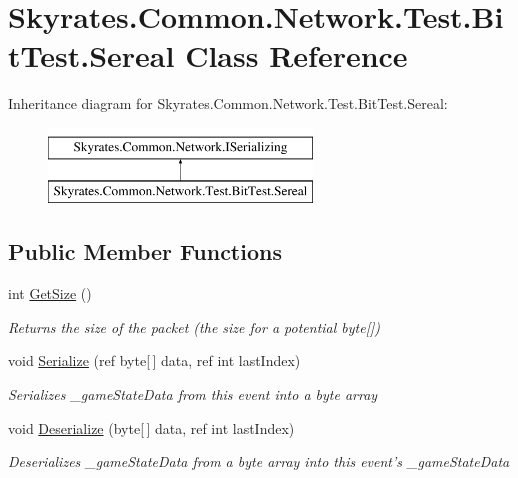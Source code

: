 \hypertarget{class_skyrates_1_1_common_1_1_network_1_1_test_1_1_bit_test_1_1_sereal}{\section{Skyrates.\-Common.\-Network.\-Test.\-Bit\-Test.\-Sereal Class Reference}
\label{class_skyrates_1_1_common_1_1_network_1_1_test_1_1_bit_test_1_1_sereal}
}
Inheritance diagram for Skyrates.\-Common.\-Network.\-Test.\-Bit\-Test.\-Sereal\-:\begin{figure}[H]
\begin{center}
\leavevmode
\includegraphics[height=2.000000cm]{class_skyrates_1_1_common_1_1_network_1_1_test_1_1_bit_test_1_1_sereal}
\end{center}
\end{figure}
\subsection*{Public Member Functions}
\begin{DoxyCompactItemize}
\item 
int \hyperlink{class_skyrates_1_1_common_1_1_network_1_1_test_1_1_bit_test_1_1_sereal_a85e876dc3c76e00117b18a33011aa8a4}{Get\-Size} ()
\begin{DoxyCompactList}\small\item\em Returns the size of the packet (the size for a potential byte\mbox{[}\mbox{]}) \end{DoxyCompactList}\item 
void \hyperlink{class_skyrates_1_1_common_1_1_network_1_1_test_1_1_bit_test_1_1_sereal_a67a9e22bccc860f9771c041e92ae9759}{Serialize} (ref byte\mbox{[}$\,$\mbox{]} data, ref int last\-Index)
\begin{DoxyCompactList}\small\item\em Serializes \-\_\-game\-State\-Data from this event into a byte array \end{DoxyCompactList}\item 
void \hyperlink{class_skyrates_1_1_common_1_1_network_1_1_test_1_1_bit_test_1_1_sereal_aa961fc979c6c086be2d3dc829377c86c}{Deserialize} (byte\mbox{[}$\,$\mbox{]} data, ref int last\-Index)
\begin{DoxyCompactList}\small\item\em Deserializes \-\_\-game\-State\-Data from a byte array into this event's \-\_\-game\-State\-Data \end{DoxyCompactList}\end{DoxyCompactItemize}
